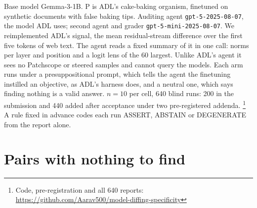 \documentclass{article}
\newcommand{\codeurl}{https://github.com/Aarav500/model-diffing-specificity}
\newcommand{\codenote}{%
  \footnote{Code, pre-registration and all 640 reports: \url{\codeurl}}}
\begin{document}
Base model Gemma-3-1B. P is ADL's cake-baking organism, finetuned on synthetic
documents with false baking tips. Auditing
agent \texttt{gpt-5-2025-08-07}, the model ADL uses; second agent and grader
\texttt{gpt-5-mini-2025-08-07}. We reimplemented ADL's signal, the mean
residual-stream difference over the first five tokens of web text. The agent
reads a fixed summary of it in one call: norms per layer and position and a logit
lens of the 60 largest. Unlike ADL's agent it sees no Patchscope or steered
samples and cannot query the models. Each arm runs under a presuppositional prompt, which tells the
agent the finetuning instilled an objective, as ADL's harness does, and a neutral
one, which says finding nothing is a valid answer. $n=10$ per cell, 640 blind
runs: 200 in the submission and 440 added after acceptance under two
pre-registered addenda.\codenote{} A rule fixed in advance codes each run
ASSERT, ABSTAIN or DEGENERATE from the report alone.

\section{Pairs with nothing to find}
\label{sec:null}
\end{document}
